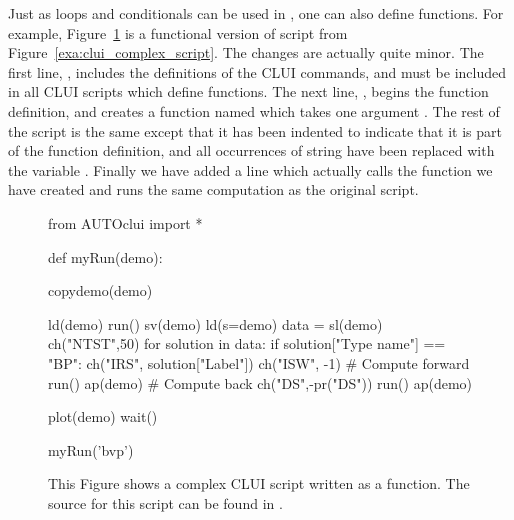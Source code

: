 \documentclass[12pt]{report}
\begin{document}
 Just as loops and conditionals can be used in \python,
 one can also define functions.  For example,
 Figure~\ref{exa:clui_complex_function} is a
 functional version of script from 
 Figure~\ref{exa:clui_complex_script}.
 The changes are actually quite minor.  
 The first line, ,
 includes the definitions of the \AUTO CLUI commands,
 and must be included in all \AUTO CLUI scripts
 which define functions.
 The next line, 
 ,
 begins the function definition, and 
 creates a function named  which
 takes one argument .  The
 rest of the script is the same except that it
 has been indented to indicate that it is
 part of the function definition, and all occurrences
 of string  have been replaced
 with the variable .
 Finally we have added a line 
 which actually calls the function we have 
 created and runs the same computation as
 the original script.

 \begin{figure}[htbp]
 {\small \begin{center} \begin{boxedverbatim}
 from AUTOclui import *

 def myRun(demo):

     copydemo(demo)

     ld(demo)
     run()
     sv(demo)
     ld(s=demo)
     data = sl(demo)
     ch("NTST",50)
     for solution in data:
         if solution["Type name"] == "BP":
             ch("IRS", solution["Label"])
             ch("ISW", -1)
             # Compute forward
             run()
             ap(demo)
             # Compute back
             ch("DS",-pr("DS"))
             run()
             ap(demo)

     plot(demo)
     wait()

 myRun('bvp')

 \end{boxedverbatim}
 \end{center} 
 }
 \caption[A complex \AUTO CLUI script as a function.]
 {This Figure shows a complex \AUTO CLUI script
 written as a function.
 The source for this script can be found in .
 }
 \label{exa:clui_complex_function}
 \end{figure}
\end{document}
